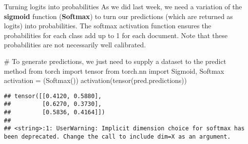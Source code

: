 \documentclass[
  10pt,
  ignorenonframetext,
  aspectratio=169]{beamer}
\newenvironment{Shaded}{\begin{snugshade}}{\end{snugshade}}
\newcommand{\CommentTok}[1]{\textcolor[rgb]{0.50,0.62,0.50}{#1}}
\newcommand{\ImportTok}[1]{\textcolor[rgb]{0.80,0.80,0.80}{#1}}
\newcommand{\NormalTok}[1]{\textcolor[rgb]{0.80,0.80,0.80}{#1}}
\newcommand{\OperatorTok}[1]{\textcolor[rgb]{0.94,0.94,0.82}{#1}}
\begin{document}
\begin{frame}[fragile]{Turning logits into probabilities}
\protect\hypertarget{turning-logits-into-probabilities}{}
As we did last week, we need a variation of the \textbf{sigmoid}
function (\textbf{Softmax}) to turn our predictions (which are returned
as logits) into probabilities. The softmax activation function ensures
the probabilities for each class add up to 1 for each document. Note
that these probabilities are not necessarily well calibrated.

\medskip
\scriptsize

\begin{Shaded}
\begin{Highlighting}[]
\CommentTok{\# To generate predictions, we just need to supply a dataset to the predict method}
\ImportTok{from}\NormalTok{ torch }\ImportTok{import}\NormalTok{ tensor}
\ImportTok{from}\NormalTok{ torch.nn }\ImportTok{import}\NormalTok{ Sigmoid, Softmax}
\NormalTok{activation }\OperatorTok{=}\NormalTok{ (Softmax())}
\NormalTok{activation(tensor(pred.predictions))}
\end{Highlighting}
\end{Shaded}

\begin{verbatim}
## tensor([[0.4120, 0.5880],
##         [0.6270, 0.3730],
##         [0.5836, 0.4164]])
## 
## <string>:1: UserWarning: Implicit dimension choice for softmax has been deprecated. Change the call to include dim=X as an argument.
\end{verbatim}
\end{frame}
\end{document}
